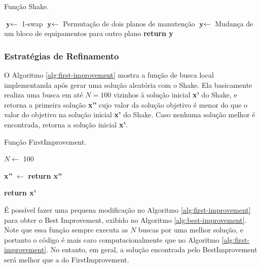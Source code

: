 \documentclass[conference]{IEEEtran}
\begin{document}
\begin{algorithm}[H]
	\caption{Função Shake.}\label{alg:shake}
	\begin{algorithmic}[1]
			\State $\textbf{y} \gets$ 1-swap
		\EndIf
			\State $\textbf{y} \gets$ Permutação de dois planos de manutenção
		\EndIf
			\State $\textbf{y} \gets$ Mudança de um bloco de equipamentos para outro plano
		\EndIf
	\Statex
	\State \textbf{return y} 

	\EndProcedure 
	\end{algorithmic}
\end{algorithm}

\subsubsection{Estratégias de Refinamento}

O Algoritmo \ref{alg:first-improvement} mostra a função de busca local
implementanda após gerar uma solução aleatória com o Shake. Ela basicamente 
realiza uma busca em até $N = 100$ vizinhos à solução inicial \textbf{x'} do Shake, 
e retorna a primeira 
solução \textbf{x''} cujo valor da solução objetivo é menor do que o valor do objetivo na 
solução inicial \textbf{x'} do Shake. Caso nenhuma solução melhor é encontrada, 
retorna a solução inicial \textbf{x'}.

\begin{algorithm}[H]
	\caption{Função FirstImprovement.}\label{alg:first-improvement}

	\begin{algorithmic}[1]

	\State $N\gets$ 100 

		\State \textbf{x''} $\gets$  
			\State \textbf{return x''} 
		\EndIf
	\EndFor
		
	\Statex
	\State \textbf{return x'} 
	\EndProcedure 
	\end{algorithmic}
\end{algorithm}

É possível fazer uma pequena modificação no Algoritmo \ref{alg:first-improvement} 
para obter o Best Improvement, exibido no Algoritmo \ref{alg:best-improvement}. 
Note que essa função sempre executa as $N$ buscas por uma melhor solução, e 
portanto o código é mais caro computacionalmente que no Algoritmo \ref{alg:first-improvement}.
No entanto, em geral, a solução encontrada pelo BestImprovement será melhor que a 
do FirstImprovement.
\end{document}
